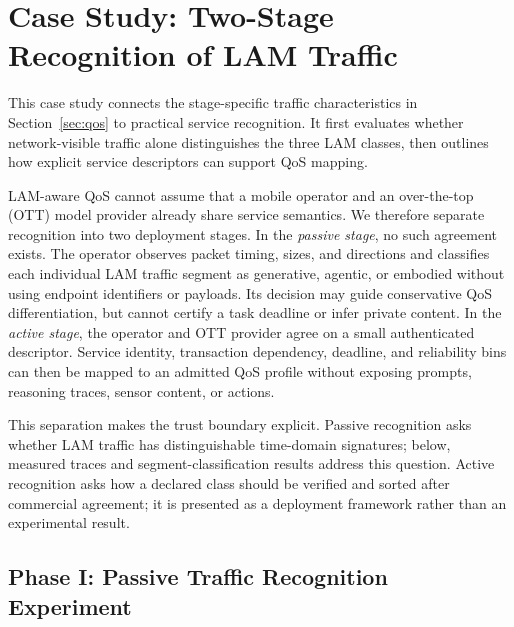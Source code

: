 \documentclass[letterpaper,journal]{IEEEtran}
\begin{document}
\section{Case Study: Two-Stage Recognition of LAM Traffic}
\label{sec:case}

This case study connects the stage-specific traffic characteristics in
Section~\ref{sec:qos} to practical service recognition. It first evaluates
whether network-visible traffic alone distinguishes the three LAM classes,
then outlines how explicit service descriptors can support QoS mapping.

LAM-aware QoS cannot assume that a mobile operator and an over-the-top (OTT)
model provider already share service semantics. We therefore separate
recognition into two deployment stages. In the \emph{passive stage}, no such
agreement exists. The operator observes packet timing, sizes, and directions
and classifies each individual LAM traffic segment as generative, agentic, or
embodied without using endpoint identifiers or payloads. Its decision may guide conservative
QoS differentiation, but cannot certify a task deadline or infer private
content. In the \emph{active stage}, the operator and OTT provider agree on a
small authenticated descriptor. Service identity, transaction dependency,
deadline, and reliability bins can then be mapped to an admitted QoS profile
without exposing prompts, reasoning traces, sensor content, or actions.

This separation makes the trust boundary explicit. Passive recognition asks
whether LAM traffic has distinguishable time-domain signatures; below, measured
traces and segment-classification results address this question. Active recognition asks how a declared
class should be verified and sorted after commercial agreement; it is presented
as a deployment framework rather than an experimental result.

\subsection{Phase I: Passive Traffic Recognition Experiment}
\end{document}
